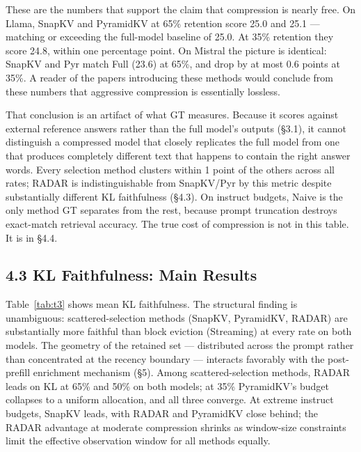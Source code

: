 \documentclass[10pt,letterpaper]{article}
\begin{document}
These are the numbers that support the claim that compression is nearly free.
On Llama, SnapKV and PyramidKV at 65\% retention score 25.0 and 25.1 --- matching
or exceeding the full-model baseline of 25.0. At 35\% retention they score 24.8,
within one percentage point. On Mistral the picture is identical: SnapKV and Pyr
match Full (23.6) at 65\%, and drop by at most 0.6 points at 35\%. A reader of the
papers introducing these methods would conclude from these numbers that aggressive
compression is essentially lossless.

That conclusion is an artifact of what GT measures. Because it scores against external
reference answers rather than the full model's outputs (§3.1), it cannot distinguish a
compressed model that closely replicates the full model from one that produces completely
different text that happens to contain the right answer words. Every selection method
clusters within 1 point of the others across all rates; RADAR is indistinguishable from
SnapKV/Pyr by this metric despite substantially different KL faithfulness (§4.3).
On instruct budgets, Naive is the only method GT separates from the rest, because
prompt truncation destroys exact-match retrieval accuracy. The true cost of
compression is not in this table. It is in §4.4.

\hypertarget{kl-faithfulness-main-results}{%
\subsection{4.3 KL Faithfulness: Main
Results}\label{kl-faithfulness-main-results}}
Table~\ref{tab:t3} shows mean KL faithfulness. The structural finding
is unambiguous: scattered-selection methods (SnapKV, PyramidKV, RADAR)
are substantially more faithful than block eviction (Streaming) at every
rate on both models. The geometry of the retained set --- distributed
across the prompt rather than concentrated at the recency boundary ---
interacts favorably with the post-prefill enrichment mechanism (§5).
Among scattered-selection methods, RADAR leads on KL at 65\% and 50\%
on both models; at 35\% PyramidKV's budget collapses to a uniform
allocation, and all three converge. At extreme instruct budgets,
SnapKV leads, with RADAR and PyramidKV close behind; the RADAR
advantage at moderate compression shrinks as window-size constraints
limit the effective observation window for all methods equally.
\end{document}
